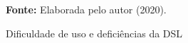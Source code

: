 \begin{figure}[ht!]
\centering

\caption{\textmd{Dificuldade de uso e deficiências da DSL}}
\label{fig:dificuldadegeral}

\par\medskip\textbf{Fonte:} Elaborada pelo autor (2020). \par\medskip

\end{figure}

